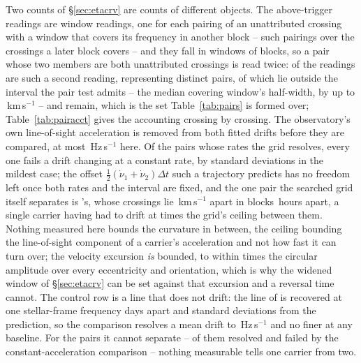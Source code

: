 Two counts of \S\ref{sec:etacrv} are counts of different objects. The
\WdNExc{} above-trigger readings are window readings, one for each pairing of
an unattributed crossing with a window that covers its frequency in another
block -- \WdNCov{} such pairings over the \PaNCovWinCross{} crossings a later
block covers -- and they fall in \PaNRepWin{} windows of \PaNRepBlock{}
blocks, so a pair whose two members are both unattributed crossings is read
twice: \PaNPairTwice{} of the readings are such a second reading,
representing \PaNPairRead{} distinct pairs, of which \PaNPairBeyond{} lie
outside the interval the pair test admits -- the median covering window's
half-width, by up to \PaDvBeyondMax\,km\,s$^{-1}$ -- and \PaNPairInside{}
remain, which is the set Table~\ref{tab:pairs} is formed over;
Table~\ref{tab:pairacct} gives the accounting crossing by crossing. The observatory's own line-of-sight acceleration is removed from both
fitted drifts before they are compared, at most \TjFrameMaxHzS\,Hz\,s$^{-1}$
here. Of the \TjNPower{} pairs whose rates the grid resolves, every one fails
a drift changing at a constant rate, by \TjSigMin{} standard deviations in
the mildest case; the offset
$\frac{1}{2}(\dot\nu_1+\dot\nu_2)\Delta t$ such a
trajectory predicts has no freedom left once both rates and the interval are
fixed, and the one pair the searched grid itself separates is \EcGridStar's,
whose crossings lie \EcGridDvKms\,km\,s$^{-1}$ apart in blocks
\EcGridDtH\,hours apart, a single carrier having had to drift at
\EcGridFactor{} times the grid's ceiling between them. Nothing measured here
bounds the curvature in between, the ceiling bounding the line-of-sight
component of a carrier's acceleration and not how fast it can turn over;
the velocity excursion \emph{is} bounded, to within \EcVsupFac{} times the
circular amplitude over every eccentricity and orientation, which is why the
widened window of \S\ref{sec:etacrv} can be set against that excursion and a
reversal time cannot. The control row is a line that does not drift: the
\TjCtlLine{} line of \TjCtlStar{} is recovered at one stellar-frame frequency
\TjCtlDtD{} days apart and \TjCtlNSig{} standard deviations from the
prediction, so the comparison resolves a mean drift to
\TjCtlDriftResHzS\,Hz\,s$^{-1}$ and no finer at any baseline. For the
\TjNOpen{} pairs it cannot separate -- \TjNPowerOpen{} of them resolved and
failed by the constant-acceleration comparison -- nothing measurable tells one
carrier from two.

